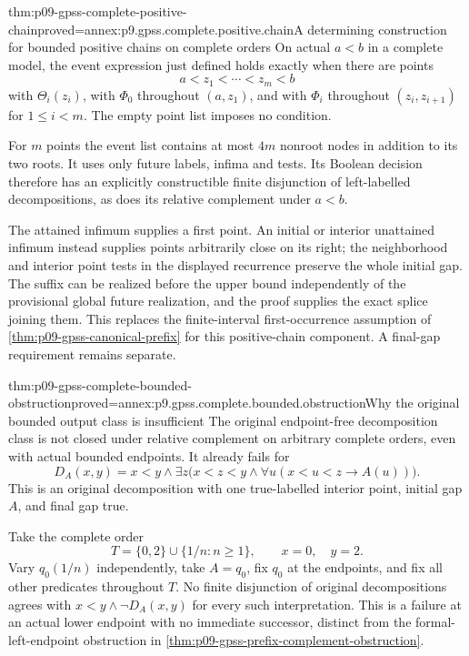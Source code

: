 \begin{hbtheorem}{thm:p09-gpss-complete-positive-chain}{proved=annex:p9.gpss.complete.positive.chain}{A determining construction for bounded positive chains on complete orders}
On actual \(a<b\) in a complete model, the event expression just
defined holds exactly when there are points
\[
                           a<z_1<\cdots<z_m<b
\]
with \(\Theta_i(z_i)\), with \(\Phi_0\) throughout
\((a,z_1)\), and with \(\Phi_i\) throughout
\((z_i,z_{i+1})\) for \(1\leq i<m\).
The empty point list imposes no condition.

For \(m\) points the event list contains at most \(4m\)
nonroot nodes in addition to its two roots. It uses only
future labels, infima and tests. Its Boolean decision
therefore has an explicitly constructible finite
disjunction of left-labelled decompositions, as does
its relative complement under \(a<b\).

The attained infimum supplies a first point. An initial
or interior unattained infimum instead supplies points
arbitrarily close on its right; the neighborhood and
interior point tests in the displayed recurrence preserve
the whole initial gap. The suffix can be realized before
the upper bound independently of the provisional global
future realization, and the proof supplies the exact
splice joining them. This replaces the finite-interval
first-occurrence assumption of
\cref{thm:p09-gpss-canonical-prefix} for this positive-chain
component. A final-gap requirement remains separate.
\end{hbtheorem}

\begin{hbtheorem}{thm:p09-gpss-complete-bounded-obstruction}{proved=annex:p9.gpss.complete.bounded.obstruction}{Why the original bounded output class is insufficient}
The original endpoint-free decomposition class is not closed under
relative complement on arbitrary complete orders, even with actual
bounded endpoints. It already fails for
\[
 D_A(x,y)=x<y\land
       \exists z\bigl(x<z<y\land
                \forall u(x<u<z\to A(u))\bigr).
\]
This is an original decomposition with one true-labelled interior
point, initial gap \(A\), and final gap true.

Take the complete order
\[
                  T=\{0,2\}\cup\{1/n:n\geq1\},
                  \qquad x=0,\quad y=2.
\]
Vary \(q_0(1/n)\) independently, take \(A=q_0\), fix \(q_0\)
at the endpoints, and fix all other predicates throughout \(T\).
No finite disjunction of original decompositions agrees with
\(x<y\land\neg D_A(x,y)\) for every such interpretation.
This is a failure at an actual lower endpoint with no immediate
successor, distinct from the formal-left-endpoint obstruction in
\cref{thm:p09-gpss-prefix-complement-obstruction}.
\end{hbtheorem}

